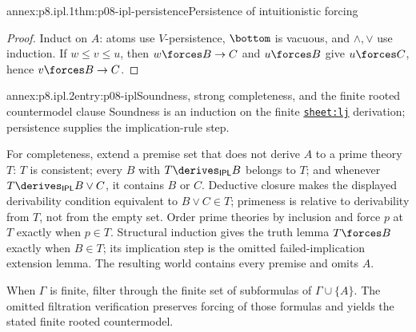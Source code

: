 
\begin{annexitem}{annex:p8.ipl.1}{thm:p08-ipl-persistence}{Persistence of intuitionistic forcing}
\begin{proof}
Induct on \(A\): atoms use \(V\)-persistence, \(\bottom\) is vacuous, and
\(\land,\lor\) use induction.  If \(w\leq v\leq u\), then
\(w\forces B\to C\) and \(u\forces B\) give \(u\forces C\), hence
\(v\forces B\to C\).
\end{proof}
\end{annexitem}

\begin{annexitem}{annex:p8.ipl.2}{entry:p08-ipl}{Soundness, strong completeness, and the finite rooted countermodel clause}
Soundness is an induction on the finite
\hyperref[sheet:lj]{\texttt{sheet:lj}} derivation; persistence supplies the
implication-rule step.

For completeness, extend a premise set that does not derive \(A\) to a prime
theory \(T\): \(T\) is consistent; every \(B\) with
\(T\derives_{\mathsf{IPL}}B\) belongs to \(T\); and whenever
\(T\derives_{\mathsf{IPL}}B\lor C\), it contains \(B\) or \(C\).
Deductive closure makes the displayed derivability condition equivalent to
\(B\lor C\in T\); primeness is relative to derivability from \(T\), not from
the empty set.  Order prime theories by inclusion and force \(p\) at \(T\)
exactly when \(p\in T\).  Structural induction gives the truth lemma
\(T\forces B\) exactly when \(B\in T\); its implication step is the omitted
failed-implication extension lemma.  The resulting world contains every
premise and omits \(A\).

When \(\Gamma\) is finite, filter through the finite set of subformulas of
\(\Gamma\cup\{A\}\).  The omitted filtration verification preserves forcing
of those formulas and yields the stated finite rooted countermodel.
\end{annexitem}
